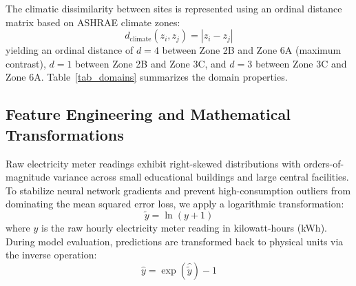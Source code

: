 \documentclass[conference]{IEEEtran}
\begin{document}
The climatic dissimilarity between sites is represented using an ordinal distance matrix based on ASHRAE climate zones:
\begin{equation}
d_{\text{climate}}(z_i, z_j) = |z_i - z_j|
\label{eq_climate_dist}
\end{equation}
yielding an ordinal distance of $d=4$ between Zone 2B and Zone 6A (maximum contrast), $d=1$ between Zone 2B and Zone 3C, and $d=3$ between Zone 3C and Zone 6A. Table~\ref{tab_domains} summarizes the domain properties.

\begin{table}[t]
\caption{Experimental Domains and Climate Classifications}
\begin{center}
\label{tab_domains}
\end{center}
\end{table}

\subsection{Feature Engineering and Mathematical Transformations}
Raw electricity meter readings exhibit right-skewed distributions with orders-of-magnitude variance across small educational buildings and large central facilities. To stabilize neural network gradients and prevent high-consumption outliers from dominating the mean squared error loss, we apply a logarithmic transformation:
\begin{equation}
\tilde{y} = \ln(y + 1)
\label{eq_log1p}
\end{equation}
where $y$ is the raw hourly electricity meter reading in kilowatt-hours (kWh). During model evaluation, predictions are transformed back to physical units via the inverse operation:
\begin{equation}
\hat{y} = \exp(\hat{\tilde{y}}) - 1
\label{eq_expm1}
\end{equation}
\end{document}

